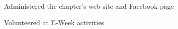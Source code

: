 \begin{service}

    \item Administered the chapter's web site and Facebook page
    \item Volunteered at E-Week activities
\end{service}
